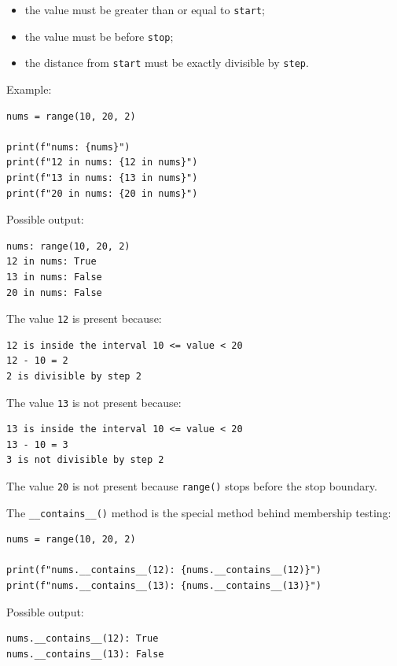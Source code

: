 \begin{itemize}
    \item the value must be greater than or equal to \texttt{start};
    \item the value must be before \texttt{stop};
    \item the distance from \texttt{start} must be exactly divisible by \texttt{step}.
\end{itemize}

Example:

\begin{verbatim}
nums = range(10, 20, 2)

print(f"nums: {nums}")
print(f"12 in nums: {12 in nums}")
print(f"13 in nums: {13 in nums}")
print(f"20 in nums: {20 in nums}")
\end{verbatim}

Possible output:

\begin{verbatim}
nums: range(10, 20, 2)
12 in nums: True
13 in nums: False
20 in nums: False
\end{verbatim}

The value \texttt{12} is present because:

\begin{verbatim}
12 is inside the interval 10 <= value < 20
12 - 10 = 2
2 is divisible by step 2
\end{verbatim}

The value \texttt{13} is not present because:

\begin{verbatim}
13 is inside the interval 10 <= value < 20
13 - 10 = 3
3 is not divisible by step 2
\end{verbatim}

The value \texttt{20} is not present because \texttt{range()} stops before the stop boundary.

The \texttt{\_\_contains\_\_()} method is the special method behind membership testing:

\begin{verbatim}
nums = range(10, 20, 2)

print(f"nums.__contains__(12): {nums.__contains__(12)}")
print(f"nums.__contains__(13): {nums.__contains__(13)}")
\end{verbatim}

Possible output:

\begin{verbatim}
nums.__contains__(12): True
nums.__contains__(13): False
\end{verbatim}

